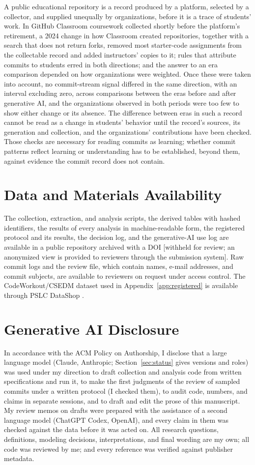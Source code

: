 \documentclass[acmsmall,screen,review,anonymous]{acmart}
\begin{document}
A public educational repository is a record produced by a platform, selected by a collector, and supplied unequally by organizations, before it is a trace of students' work. In GitHub Classroom coursework collected shortly before the platform's retirement, a 2024 change in how Classroom created repositories, together with a search that does not return forks, removed most starter-code assignments from the collectable record and added instructors' copies to it; rules that attribute commits to students erred in both directions; and the answer to an era comparison depended on how organizations were weighted. Once these were taken into account, no commit-stream signal differed in the same direction, with an interval excluding zero, across comparisons between the eras before and after generative AI, and the organizations observed in both periods were too few to show either change or its absence. The difference between eras in such a record cannot be read as a change in students' behavior until the record's sources, its generation and collection, and the organizations' contributions have been checked. Those checks are necessary for reading commits as learning; whether commit patterns reflect learning or understanding has to be established, beyond them, against evidence the commit record does not contain.

\section*{Data and Materials Availability}
The collection, extraction, and analysis scripts, the derived tables with hashed identifiers, the results of every analysis in machine-readable form, the registered protocol and its results, the decision log, and the generative-AI use log are available in a public repository archived with a DOI [withheld for review; an anonymized view is provided to reviewers through the submission system]. Raw commit logs and the review file, which contain names, e-mail addresses, and commit subjects, are available to reviewers on request under access control. The CodeWorkout/CSEDM dataset used in Appendix~\ref{app:registered} is available through PSLC DataShop \citep{codeworkout2020dataset}.

\section*{Generative AI Disclosure}
In accordance with the ACM Policy on Authorship, I disclose that a large language model (Claude, Anthropic; Section~\ref{sec:status} gives versions and roles) was used under my direction to draft collection and analysis code from written specifications and run it, to make the first judgments of the review of sampled commits under a written protocol (I checked them), to audit code, numbers, and claims in separate sessions, and to draft and edit the prose of this manuscript. My review memos on drafts were prepared with the assistance of a second language model (ChatGPT Codex, OpenAI), and every claim in them was checked against the data before it was acted on. All research questions, definitions, modeling decisions, interpretations, and final wording are my own; all code was reviewed by me; and every reference was verified against publisher metadata.
\end{document}

